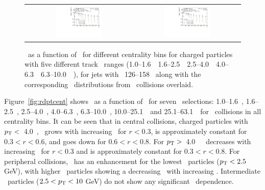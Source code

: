 \begin{figure}
{\begin{tabular}{cc}
	 \includegraphics[width=0.45\textwidth]{figures_results/ChPS_final_dR_CONF_DpT_data_jet7_cent4} &
	 \includegraphics[width=0.45\textwidth]{figures_results/ChPS_final_dR_CONF_DpT_data_jet7_cent5} \\
\end{tabular} }
   \caption{ \Dptr\ as a function of \rvar\ for different centrality bins for charged particles with five different track \pT\ ranges (1.0--1.6~\GeV\, 1.6--2.5~\GeV\, 2.5--4.0~\GeV\, 4.0--6.3~\GeV\, 6.3--10.0~\GeV\ ), for jets with \pt\ 126--158 \GeV\, along with the corresponding \Dptr\ distributions from \pp\ collisions overlaid. }
      \label{fig:dptr_pbpb_pp}
\end{figure}



Figure~\ref{fig:rdptcent} shows \RDptr\ as a function of \rvar\ for seven \pt\ selections: 1.0--1.6~\GeV, 1.6--2.5~\GeV, 2.5--4.0~\GeV, 4.0--6.3~\GeV, 6.3--10.0~\GeV, 10.0--25.1~\GeV\ and 25.1--63.1~\GeV\ for \pbpb\ collisions in all centrality bins. It can be seen that in central collisions, charged particles
with $p_{\mathrm{T}} <$~4.0~\GeV, \RDptr\ grows with increasing \rvar\ for $r <0.3$, is approximately constant for
$0.3 < r <0.6$, and goes down for $0.6 < r < 0.8$.  For $p_{\mathrm{T}} > $~4.0~\GeV\ \RDptr\ decreases with increasing \rvar\ for $ r < 0.3$
and is approximately constant for $ 0.3 < r <0.8$.
For peripheral collisions, \RDptr\ has an enhancement for the lowest \pt\ particles ($p_{\mathrm{T}} < 2.5$ GeV), with higher \pt\ particles showing a decreasing \RDptr\ with increasing \rvar. Intermediate \pt\ particles ($2.5 < p_{\mathrm{T}} < 10 $ GeV) do not show any significant \rvar\ dependence.

